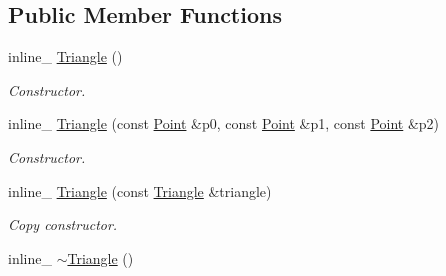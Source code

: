 \subsection*{Public Member Functions}
\begin{DoxyCompactItemize}
\item 
inline\+\_\+ \hyperlink{classOpcode_1_1Triangle_aa1c54e92402df7eaffd6a085cfb77abc}{Triangle} ()\hypertarget{classOpcode_1_1Triangle_aa1c54e92402df7eaffd6a085cfb77abc}{}\label{classOpcode_1_1Triangle_aa1c54e92402df7eaffd6a085cfb77abc}

\begin{DoxyCompactList}\small\item\em Constructor. \end{DoxyCompactList}\item 
inline\+\_\+ \hyperlink{classOpcode_1_1Triangle_a746c51f467f2261749852ed2637b9122}{Triangle} (const \hyperlink{classOpcode_1_1Point}{Point} \&p0, const \hyperlink{classOpcode_1_1Point}{Point} \&p1, const \hyperlink{classOpcode_1_1Point}{Point} \&p2)\hypertarget{classOpcode_1_1Triangle_a746c51f467f2261749852ed2637b9122}{}\label{classOpcode_1_1Triangle_a746c51f467f2261749852ed2637b9122}

\begin{DoxyCompactList}\small\item\em Constructor. \end{DoxyCompactList}\item 
inline\+\_\+ \hyperlink{classOpcode_1_1Triangle_a3adf9f46b1e81149c3eaf4c9b8cfa25d}{Triangle} (const \hyperlink{classOpcode_1_1Triangle}{Triangle} \&triangle)\hypertarget{classOpcode_1_1Triangle_a3adf9f46b1e81149c3eaf4c9b8cfa25d}{}\label{classOpcode_1_1Triangle_a3adf9f46b1e81149c3eaf4c9b8cfa25d}

\begin{DoxyCompactList}\small\item\em Copy constructor. \end{DoxyCompactList}\item 
inline\+\_\+ \hyperlink{classOpcode_1_1Triangle_a7af68ff934565b96a10fb875b61e3fc2}{$\sim$\+Triangle} ()\hypertarget{classOpcode_1_1Triangle_a7af68ff934565b96a10fb875b61e3fc2}{}\label{classOpcode_1_1Triangle_a7af68ff934565b96a10fb875b61e3fc2}


\end{DoxyCompactItemize}
